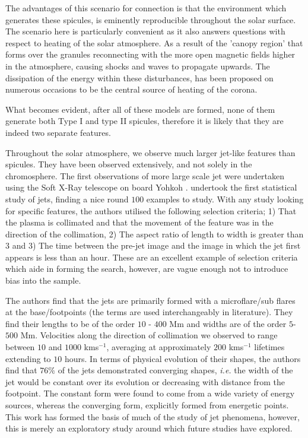 The advantages of this scenario for connection is that the environment which generates these spicules, is eminently reproducible throughout the solar surface.
The scenario here is particularly convenient as it also answers questions with respect to heating of the solar atmosphere.
As a result of the 'canopy region' that forms over the granules reconnecting with the more open magnetic fields higher in the atmosphere, causing shocks and waves to propagate upwards.
The dissipation of the energy within these disturbances, has been proposed on numerous occasions to be the central source of heating of the corona.  

What becomes evident, after all of these models are formed, none of them generate both Type I and type II spicules, therefore it is likely that they are indeed two separate features.


Throughout the solar atmosphere, we observe much larger jet-like features than spicules.
They have been observed extensively, and not solely in the chromosphere.
The first observations of more large scale jet were undertaken using the Soft X-Ray telescope on board Yohkoh \citep{Tsuneta1991}.
\cite{Shimojo1996} undertook the first statistical study of jets, finding a nice round $100$ examples to study.
With any study looking for specific features, the authors utilised the following selection criteria; 1) That the plasma is collimated and that the movement of the feature was in the direction of the collimation, 2) The aspect ratio of length to width is greater than $3$ and 3) The time between the pre-jet image and the image in which the jet first appears is less than an hour.
These are an excellent example of selection criteria which aide in forming the search, however, are vague enough not to introduce bias into the sample.

The authors find that the jets are primarily formed with a microflare/sub flares at the base/footpoints (the terms are used interchangeably in literature).
They find their lengths to be of the order $10$ - $400$ Mm and widths are of the order $5$-$500$ Mm.
Velocities along the direction of collimation we observed to range between $10$ and $1000$ kms$^{-1}$, averaging at approximately $200$ kms$^{-1}$ lifetimes extending to $10$ hours.
In terms of physical evolution of their shapes, the authors find that $76\%$ of the jets demonstrated converging shapes, \emph{i.e.} the width of the jet would be constant over its evolution or decreasing with distance from the footpoint. The constant form were found to come from a wide variety of energy sources, whereas the converging form, explicitly formed from energetic points. 
This work has formed the basis of much of the study of jet phenomena, however, this is merely an exploratory study around which future studies have explored.

